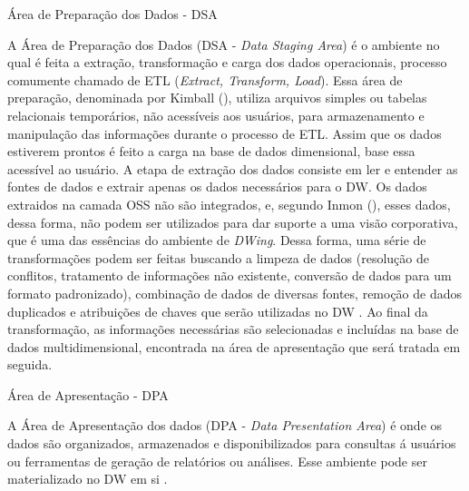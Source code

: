 \begin{description}
\item[Área de Preparação dos Dados - DSA]
\end{description}
%

A Área de Preparação dos Dados (DSA - \emph{Data Staging Area}) é o ambiente no qual é feita a extração, transformação e carga dos dados operacionais, processo comumente chamado de ETL (\emph{Extract, Transform, Load}).
%
Essa área de preparação, denominada por Kimball (\citeyear{kimball2002}), utiliza arquivos simples ou tabelas relacionais temporários, não acessíveis aos usuários, para armazenamento e manipulação das informações durante o processo de ETL.
%
Assim que os dados estiverem prontos é feito a carga na base de dados dimensional, base essa acessível ao usuário.
%
A etapa de extração dos dados consiste em ler e entender as fontes de dados e extrair apenas os dados necessários para o DW.
%
Os dados extraidos na camada OSS não são integrados, e, segundo Inmon (\citeyear{inmon2002}), esses dados, dessa forma, não podem ser utilizados para dar suporte a uma visão corporativa, que é uma das essências do ambiente de \emph{DWing}.
%
Dessa forma, uma série de transformações podem ser feitas buscando a limpeza de dados (resolução de conflitos, tratamento de informações não existente, conversão de dados para um formato padronizado), combinação de dados de diversas fontes, remoção de dados duplicados e atribuições de chaves que serão utilizadas no DW \cite{kimball2002}.
%
Ao final da transformação, as informações necessárias são selecionadas e incluídas na base de dados multidimensional, encontrada na área de apresentação que será tratada em seguida.

\begin{description}
\item[Área de Apresentação - DPA]
\end{description}
%

A Área de Apresentação dos dados (DPA - \emph{Data Presentation Area}) é onde os dados são organizados, armazenados e disponibilizados para consultas á usuários ou ferramentas de geração de relatórios ou análises. Esse ambiente pode ser materializado no DW em si \cite{kimball2002}. 


